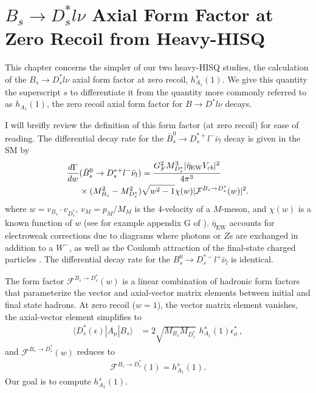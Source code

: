 ﻿\chapter{$B_s\to D_s^*l\nu$ Axial Form Factor at Zero Recoil from Heavy-HISQ}
\label{chap:BsDsstar}

This chapter concerns the simpler of our two heavy-HISQ studies, the calculation of the $B_s\to D^*_sl\nu$ axial form factor at zero recoil, $h^s_{A_1}(1)$. We give this quantity the superscript $s$ to differentiate it from the quantity more commonly referred to as $h_{A_1}(1)$, the zero recoil axial form factor for $B\to D^*l\nu$ decays.

I will breifly review the definition of this form factor (at zero recoil) for ease of reading. The differential decay rate for the $\bar{B}_s^0\to D_s^{*+} l^- \bar{\nu}_l$ decay is given in the SM by
\begin{align}
  {d \Gamma \over dw} &(\bar{B}_s^0\to D_s^{*+} l^- \bar{\nu}_l) = {G_F^2 M_{D_s^*}^3 | \bar{\eta}_{\text{EW}} V_{cb} |^2 \over 4\pi^3}
\\  &\times(M_{B_s}^2-M_{D_s^*}^2) \sqrt{w^2-1} \chi(w) | \mathcal{F}^{B_s\to D_s^*}(w) |^2. \nonumber
\end{align}
where $w = v_{B_s} \cdot v_{D^*_s}$, $v_M = p_M/M_M$ is the 4-velocity of a $M$-meson, and $\chi(w)$ is a known function of $w$ (see for example appendix G of \cite{Harrison:2017fmw}). $\bar{\eta}_{\text{EW}}$ accounts for electroweak corrections due to diagrams where photons or $Z$s are exchanged in addition to a $W^-$, as well as the Coulomb attraction of the final-state charged particles \cite{SIRLIN198283,Ginsberg1968,PhysRevD.41.1736}. The differential decay rate for the $B_s^0\to D_s^{*-} l^+ \bar{\nu}_l$ is identical.

The form factor $\mathcal{F}^{B_s\to D_s^*}(w)$ is a linear combination of hadronic form factors that parameterize the vector and axial-vector matrix elements between initial and final state hadrons. At zero recoil ($w=1$), the vector matrix element vanishes, the axial-vector element simplifies to
\begin{align}
  \langle D^*_s(\epsilon)| A_{\mu} | B_s \rangle &= 2 \sqrt{M_{B_s}M_{D^*_s}}\,\, h^s_{A_1}(1) \epsilon^{*}_{\mu}\,,
\end{align}
and $\mathcal{F}^{B_s\to D_s^*}(w)$ reduces to
\begin{align}
  \mathcal{F}^{B_s\to D_s^*}(1) = h^s_{A_1}(1).
\end{align}
Our goal is to compute $h^s_{A_1}(1)$.

